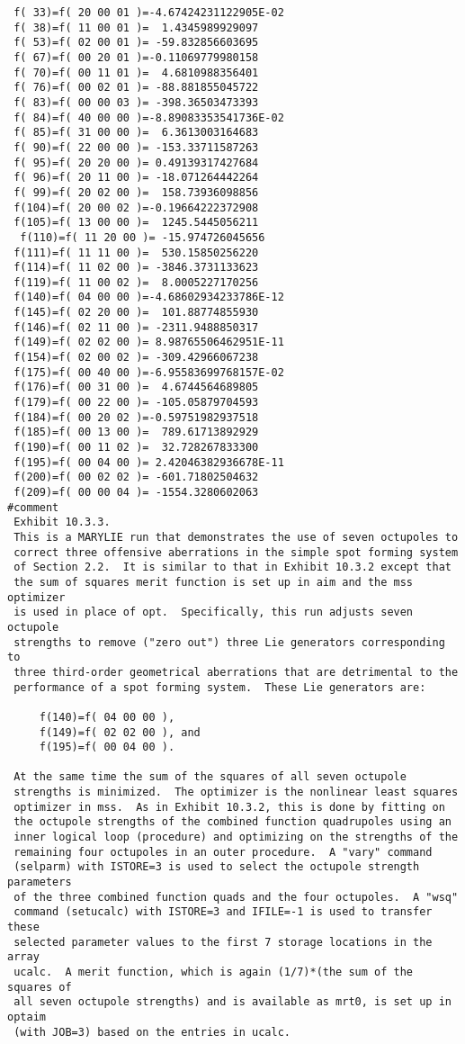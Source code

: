 \begin{footnotesize}
\begin{verbatim}
 f( 33)=f( 20 00 01 )=-4.67424231122905E-02
 f( 38)=f( 11 00 01 )=  1.4345989929097
 f( 53)=f( 02 00 01 )= -59.832856603695
 f( 67)=f( 00 20 01 )=-0.11069779980158
 f( 70)=f( 00 11 01 )=  4.6810988356401
 f( 76)=f( 00 02 01 )= -88.881855045722
 f( 83)=f( 00 00 03 )= -398.36503473393
 f( 84)=f( 40 00 00 )=-8.89083353541736E-02
 f( 85)=f( 31 00 00 )=  6.3613003164683
 f( 90)=f( 22 00 00 )= -153.33711587263
 f( 95)=f( 20 20 00 )= 0.49139317427684
 f( 96)=f( 20 11 00 )= -18.071264442264
 f( 99)=f( 20 02 00 )=  158.73936098856
 f(104)=f( 20 00 02 )=-0.19664222372908
 f(105)=f( 13 00 00 )=  1245.5445056211
  f(110)=f( 11 20 00 )= -15.974726045656
 f(111)=f( 11 11 00 )=  530.15850256220
 f(114)=f( 11 02 00 )= -3846.3731133623
 f(119)=f( 11 00 02 )=  8.0005227170256
 f(140)=f( 04 00 00 )=-4.68602934233786E-12
 f(145)=f( 02 20 00 )=  101.88774855930
 f(146)=f( 02 11 00 )= -2311.9488850317
 f(149)=f( 02 02 00 )= 8.98765506462951E-11
 f(154)=f( 02 00 02 )= -309.42966067238
 f(175)=f( 00 40 00 )=-6.95583699768157E-02
 f(176)=f( 00 31 00 )=  4.6744564689805
 f(179)=f( 00 22 00 )= -105.05879704593
 f(184)=f( 00 20 02 )=-0.59751982937518
 f(185)=f( 00 13 00 )=  789.61713892929
 f(190)=f( 00 11 02 )=  32.728267833300
 f(195)=f( 00 04 00 )= 2.42046382936678E-11
 f(200)=f( 00 02 02 )= -601.71802504632
 f(209)=f( 00 00 04 )= -1554.3280602063
#comment
 Exhibit 10.3.3.
 This is a MARYLIE run that demonstrates the use of seven octupoles to
 correct three offensive aberrations in the simple spot forming system
 of Section 2.2.  It is similar to that in Exhibit 10.3.2 except that
 the sum of squares merit function is set up in aim and the mss optimizer
 is used in place of opt.  Specifically, this run adjusts seven octupole
 strengths to remove ("zero out") three Lie generators corresponding to
 three third-order geometrical aberrations that are detrimental to the
 performance of a spot forming system.  These Lie generators are:

     f(140)=f( 04 00 00 ),
     f(149)=f( 02 02 00 ), and
     f(195)=f( 00 04 00 ).

 At the same time the sum of the squares of all seven octupole
 strengths is minimized.  The optimizer is the nonlinear least squares
 optimizer in mss.  As in Exhibit 10.3.2, this is done by fitting on
 the octupole strengths of the combined function quadrupoles using an
 inner logical loop (procedure) and optimizing on the strengths of the
 remaining four octupoles in an outer procedure.  A "vary" command
 (selparm) with ISTORE=3 is used to select the octupole strength parameters
 of the three combined function quads and the four octupoles.  A "wsq"
 command (setucalc) with ISTORE=3 and IFILE=-1 is used to transfer these
 selected parameter values to the first 7 storage locations in the array
 ucalc.  A merit function, which is again (1/7)*(the sum of the squares of
 all seven octupole strengths) and is available as mrt0, is set up in optaim
 (with JOB=3) based on the entries in ucalc.


\end{verbatim}
\end{footnotesize}
